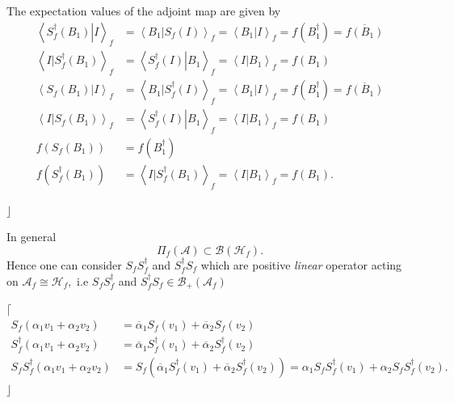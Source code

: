 \documentclass[aps,preprint]{revtex4}%
\begin{document}
The expectation values of the adjoint map are given by
\begin{align}
\left\langle \left.  S_{f}^{\dagger}\left(  B_{1}\right)  \right\vert
I\right\rangle _{f}  &  =\left\langle \left.  B_{1}\right\vert S_{f}\left(
I\right)  \right\rangle _{f}=\left\langle \left.  B_{1}\right\vert
I\right\rangle _{f}=f\left(  B_{1}^{\dagger}\right)  =\overline{f\left(
B_{1}\right)  }\\
\left\langle \left.  I\right\vert S_{f}^{\dagger}\left(  B_{1}\right)
\right\rangle _{f}  &  =\left\langle \left.  S_{f}^{\dagger}\left(  I\right)
\right\vert B_{1}\right\rangle _{f}=\left\langle \left.  I\right\vert
B_{1}\right\rangle _{f}=f\left(  B_{1}\right) \\
\left\langle \left.  S_{f}\left(  B_{1}\right)  \right\vert I\right\rangle
_{f}  &  =\left\langle \left.  B_{1}\right\vert S_{f}^{\dagger}\left(
I\right)  \right\rangle _{f}=\left\langle \left.  B_{1}\right\vert
I\right\rangle _{f}=f\left(  B_{1}^{\dagger}\right)  =\overline{f\left(
B_{1}\right)  }\\
\left\langle \left.  I\right\vert S_{f}\left(  B_{1}\right)  \right\rangle
_{f}  &  =\left\langle \left.  S_{f}^{\dagger}\left(  I\right)  \right\vert
B_{1}\right\rangle _{f}=\left\langle \left.  I\right\vert B_{1}\right\rangle
_{f}=f\left(  B_{1}\right) \\
f\left(  S_{f}\left(  B_{1}\right)  \right)   &  =f\left(  B_{1}^{\dagger
}\right) \\
f\left(  S_{f}^{\dagger}\left(  B_{1}\right)  \right)   &  =\left\langle
\left.  I\right\vert S_{f}^{\dagger}\left(  B_{1}\right)  \right\rangle
_{f}=\left\langle \left.  I\right\vert B_{1}\right\rangle _{f}=f\left(
B_{1}\right)  .
\end{align}


$\rfloor$

In general
\begin{equation}
\Pi_{f}\left(  \mathcal{A}\right)  \subset\mathcal{B}\left(  \mathcal{H}%
_{f}\right)  .
\end{equation}
Hence one can consider $S_{f}S_{f}^{\dagger}$ and $S_{f}^{\dagger}S_{f}$ which
are positive \emph{linear }operator acting on $\mathcal{A}_{f}\cong%
\mathcal{H}_{f},$ i.e $S_{f}S_{f}^{\dagger}$ and $S_{f}^{\dagger}S_{f}%
\in\mathcal{B}_{+}\left(  \mathcal{A}_{f}\right)  $

$\lceil$%
\begin{align}
S_{f}\left(  \alpha_{1}v_{1}+\alpha_{2}v_{2}\right)   &  =\overline{\alpha
}_{1}S_{f}\left(  v_{1}\right)  +\overline{\alpha}_{2}S_{f}\left(
v_{2}\right) \\
S_{f}^{\dagger}\left(  \alpha_{1}v_{1}+\alpha_{2}v_{2}\right)   &
=\overline{\alpha}_{1}S_{f}^{\dagger}\left(  v_{1}\right)  +\overline{\alpha
}_{2}S_{f}^{\dagger}\left(  v_{2}\right) \\
S_{f}S_{f}^{\dagger}\left(  \alpha_{1}v_{1}+\alpha_{2}v_{2}\right)   &
=S_{f}\left(  \overline{\alpha}_{1}S_{f}^{\dagger}\left(  v_{1}\right)
+\overline{\alpha}_{2}S_{f}^{\dagger}\left(  v_{2}\right)  \right)
=\alpha_{1}S_{f}S_{f}^{\dagger}\left(  v_{1}\right)  +\alpha_{2}S_{f}%
S_{f}^{\dagger}\left(  v_{2}\right)  .
\end{align}
$\rfloor$
\end{document}

